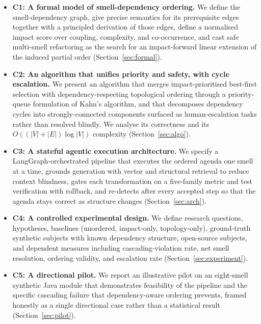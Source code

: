 \documentclass[journal,onecolumn,11pt]{IEEEtran}
\begin{document}
\begin{itemize}
\item \textbf{C1: A formal model of smell-dependency ordering.} We define the smell-dependency graph, give precise semantics for its prerequisite edges together with a principled derivation of those edges, define a normalised impact score over coupling, complexity, and co-occurrence, and cast safe multi-smell refactoring as the search for an impact-forward linear extension of the induced partial order (Section~\ref{sec:formal}).

\item \textbf{C2: An algorithm that unifies priority and safety, with cycle escalation.} We present an algorithm that merges impact-prioritised best-first selection with dependency-respecting topological ordering through a priority-queue formulation of Kahn's algorithm, and that decomposes dependency cycles into strongly-connected components surfaced as human-escalation tasks rather than resolved blindly. We analyse its correctness and its $O((|V|+|E|)\log|V|)$ complexity (Section~\ref{sec:algo}).

\item \textbf{C3: A stateful agentic execution architecture.} We specify a LangGraph-orchestrated pipeline that executes the ordered agenda one smell at a time, grounds generation with vector and structural retrieval to reduce context blindness, gates each transformation on a five-family metric and test verification with rollback, and re-detects after every accepted step so that the agenda stays correct as structure changes (Section~\ref{sec:arch}).

\item \textbf{C4: A controlled experimental design.} We define research questions, hypotheses, baselines (unordered, impact-only, topology-only), ground-truth synthetic subjects with known dependency structure, open-source subjects, and dependent measures including cascading-violation rate, net smell resolution, ordering validity, and escalation rate (Section~\ref{sec:experiment}).

\item \textbf{C5: A directional pilot.} We report an illustrative pilot on an eight-smell synthetic Java module that demonstrates feasibility of the pipeline and the specific cascading failure that dependency-aware ordering prevents, framed honestly as a single directional case rather than a statistical result (Section~\ref{sec:pilot}).
\end{itemize}
\end{document}
